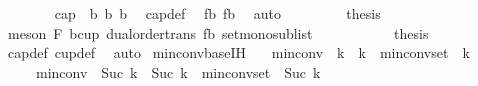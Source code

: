 \begin{isabellebody}
\ \ \ \ \ \ \isamarkupfalse%
\ {\isachardoublequoteopen}cap\ {}\ {\isacharbrackleft}{\kern0pt}b{}{\isacharcomma}{\kern0pt}\ b{}{\isacharcomma}{\kern0pt}\ b{}{\isacharbrackright}{\kern0pt}{\isachardoublequoteclose}\ \isamarkupfalse%
\ cap{\isacharunderscore}{\kern0pt}def\ \isamarkupfalse%
\ fb{}\ fb{}\ \isamarkupfalse%
\ auto\ \isanewline
\ \ \ \ \ \ \isamarkupfalse%
\ {\isacharquery}{\kern0pt}thesis\ \isamarkupfalse%
\ {\isacharparenleft}{\kern0pt}meson\ F{}\ bcup{\isacharparenleft}{\kern0pt}{}{\isacharparenright}{\kern0pt}\ dual{\isacharunderscore}{\kern0pt}order{\isachardot}{\kern0pt}trans\ fb{}\ set{\isacharunderscore}{\kern0pt}mono{\isacharunderscore}{\kern0pt}sublist{\isacharparenright}{\kern0pt}\isanewline
\ \ \ \ \isamarkupfalse%
\isanewline
\ \ \isamarkupfalse%
\isanewline
\ \ \isamarkupfalse%
\ {\isacharquery}{\kern0pt}thesis\isanewline
\ \ \ \ \isamarkupfalse%
\ cap{\isacharunderscore}{\kern0pt}def\ cup{\isacharunderscore}{\kern0pt}def\ \isamarkupfalse%
\ auto\isanewline
{}\isamarkupfalse%
%
\endisatagproof
{\isafoldproof}%
%
\isadelimproof
\isanewline
%
\endisadelimproof
\isanewline
{}\isamarkupfalse%
\ min{\isacharunderscore}{\kern0pt}conv{\isacharunderscore}{\kern0pt}base{\isacharunderscore}{\kern0pt}IH{\isacharcolon}{\kern0pt}\isanewline
\ \ \ {\isachardoublequoteopen}min{\isacharunderscore}{\kern0pt}conv\ {}\ k\ {\isacharequal}{\kern0pt}\ k\ {\isasymand}\ min{\isacharunderscore}{\kern0pt}conv{\isacharunderscore}{\kern0pt}set\ {}\ k\ {\isasymnoteq}\ {\isacharbraceleft}{\kern0pt}{\isacharbraceright}{\kern0pt}{\isachardoublequoteclose}\isanewline
\ \ \ \ \ {\isachardoublequoteopen}min{\isacharunderscore}{\kern0pt}conv\ {}\ {\isacharparenleft}{\kern0pt}Suc\ k{\isacharparenright}{\kern0pt}\ {\isasymle}\ Suc\ k\ {\isasymand}\ min{\isacharunderscore}{\kern0pt}conv{\isacharunderscore}{\kern0pt}set\ {}\ {\isacharparenleft}{\kern0pt}Suc\ k{\isacharparenright}{\kern0pt}\ {\isasymnoteq}\ {\isacharbraceleft}{\kern0pt}{\isacharbraceright}{\kern0pt}{\isachardoublequoteclose}\isanewline
%
\isadelimproof
%
\endisadelimproof
%
\isatagproof
{}\isamarkupfalse%
\isanewline
\ \ \isamarkupfalse%

\end{isabellebody}
